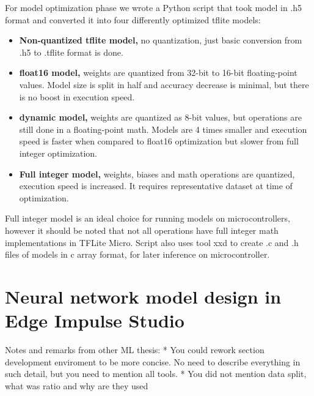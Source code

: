 For model optimization phase we wrote a Python script that took model in .h5 format and converted it into four differently optimized tflite models:
\begin{itemize}
    \item \textbf{Non-quantized tflite model,} no quantization, just basic conversion from .h5 to .tflite format is done.
    \item \textbf{float16 model,} weights are quantized from 32-bit to 16-bit floating-point values. Model size is split in half and accuracy decrease is minimal, but there is no boost in execution speed.
    \item \textbf{dynamic model,} weights are quantized as 8-bit values, but operations are still done in a floating-point math. Models are 4 times smaller and execution speed is faster when compared to float16 optimization but slower from full integer optimization.
    \item \textbf{Full integer model,} weights, biases and math operations are quantized, execution speed is increased. It requires representative dataset at time of optimization.
\end{itemize}

Full integer model is an ideal choice for running models on microcontrollers, however it should be noted that not all operations have full integer math implementations in TFLite Micro.
Script also uses tool xxd to create .c and .h files of models in c array format, for later inference on microcontroller.

\section{ Neural network model design in Edge Impulse Studio}


Notes and remarks from other ML thesis:
* You could rework section development enviroment to be more concise. No need to describe everything in such detail, but you need to mention all tools.
* You did not mention data split, what was ratio and why are they used
